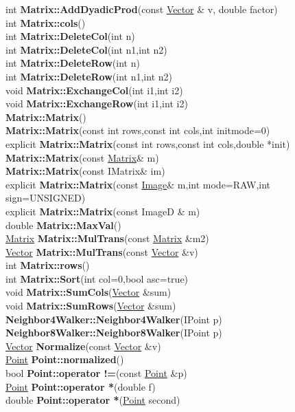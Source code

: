 \documentclass[10pt,titlepage]{article}
\def\functionlistentry#1#2#3#4#5#6{\noindent #1 {\bf #2}(#3) \dotfill #6\\}
\begin{document}
{{\functionlistentry{int}{Matrix::AddDyadicProd}{const \hyperlink{Vector}{Vector} \& v, double factor}{277}{datastructures}{}
\functionlistentry{int}{Matrix::cols}{}{265}{datastructures}{}
\functionlistentry{int}{Matrix::DeleteCol}{int n}{271}{datastructures}{}
\functionlistentry{int}{Matrix::DeleteCol}{int n1,int n2}{272}{datastructures}{}
\functionlistentry{int}{Matrix::DeleteRow}{int n}{269}{datastructures}{}
\functionlistentry{int}{Matrix::DeleteRow}{int n1,int n2}{270}{datastructures}{}
\functionlistentry{void}{Matrix::ExchangeCol}{int i1,int i2}{268}{datastructures}{}
\functionlistentry{void}{Matrix::ExchangeRow}{int i1,int i2}{267}{datastructures}{}
\functionlistentry{}{Matrix::Matrix}{}{255}{datastructures}{}
\functionlistentry{}{Matrix::Matrix}{const int rows,const int cols,int initmode=0}{256}{datastructures}{}
\functionlistentry{explicit}{Matrix::Matrix}{const int rows,const int cols,double *init}{257}{datastructures}{}
\functionlistentry{}{Matrix::Matrix}{const \hyperlink{Matrix}{Matrix}\& m}{258}{datastructures}{}
\functionlistentry{}{Matrix::Matrix}{const IMatrix\& im}{259}{datastructures}{}
\functionlistentry{explicit}{Matrix::Matrix}{const \hyperlink{Image}{Image}\& m,int mode=RAW,int sign=UNSIGNED}{260}{datastructures}{}
\functionlistentry{explicit}{Matrix::Matrix}{const ImageD \& m}{261}{datastructures}{}
\functionlistentry{double}{Matrix::MaxVal}{}{273}{datastructures}{}
\functionlistentry{\hyperlink{Matrix}{Matrix}}{Matrix::MulTrans}{const \hyperlink{Matrix}{Matrix} \&m2}{262}{datastructures}{}
\functionlistentry{\hyperlink{Vector}{Vector}}{Matrix::MulTrans}{const \hyperlink{Vector}{Vector} \&v}{263}{datastructures}{}
\functionlistentry{int}{Matrix::rows}{}{264}{datastructures}{}
\functionlistentry{int}{Matrix::Sort}{int col=0,bool asc=true}{278}{datastructures}{}
\functionlistentry{void}{Matrix::SumCols}{\hyperlink{Vector}{Vector} \&sum}{275}{datastructures}{}
\functionlistentry{void}{Matrix::SumRows}{\hyperlink{Vector}{Vector} \&sum}{274}{datastructures}{}
\functionlistentry{}{Neighbor4Walker::Neighbor4Walker}{IPoint p}{191}{datastructures}{}
\functionlistentry{}{Neighbor8Walker::Neighbor8Walker}{IPoint p}{192}{datastructures}{}
\functionlistentry{\hyperlink{Vector}{Vector}}{Normalize}{const \hyperlink{Vector}{Vector} \&v}{253}{datastructures}{}
\functionlistentry{\hyperlink{Point}{Point}}{Point::normalized}{}{173}{datastructures}{}
\functionlistentry{bool}{Point::operator !=}{const \hyperlink{Point}{Point} \&p}{160}{datastructures}{}
\functionlistentry{\hyperlink{Point}{Point}}{Point::operator *}{double f}{165}{datastructures}{}
\functionlistentry{double}{Point::operator *}{\hyperlink{Point}{Point} second}{167}{datastructures}{}
}}
\end{document}
